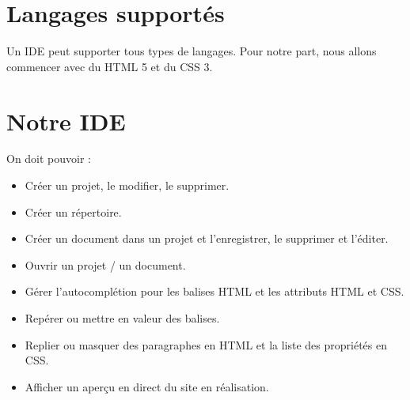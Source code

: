 \documentclass[a4paper,12pt]{article} %
\begin{document}
\section{Langages supportés}
	Un IDE peut supporter tous types de langages. Pour notre part, nous allons commencer avec du HTML 5 et du CSS 3.
	
\section{Notre IDE}
	On doit pouvoir :
	\begin{itemize}
		\item Créer un projet, le modifier, le supprimer.
		\item Créer un répertoire.
		\item Créer un document dans un projet et l'enregistrer, le supprimer et l'éditer.
		\item Ouvrir un projet / un document.
		\item Gérer l'autocomplétion pour les balises HTML et les attributs HTML et CSS.
		\item Repérer ou mettre en valeur des balises.
		\item Replier ou masquer des paragraphes en HTML et la liste des propriétés en CSS.
		\item Afficher un aperçu en direct du site en réalisation.
	\end{itemize}
\end{document}
